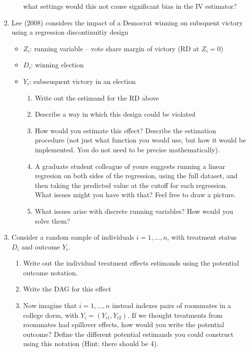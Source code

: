 \documentclass[11pt, a4paper]{article}
\begin{document}
\begin{enumerate}
\begin{enumerate}
      what settings would this not cause significant bias in the IV
      estimator?
    \end{enumerate}
  \item Lee (2008) considers the impact of a Democrat winning on subsquent victory using a regression discontinuitiy design
  \begin{itemize}
  \item $Z_{i}$: running variable -- vote share margin of victory (RD at $Z_{i} = 0$)
  \item $D_{i}$: winning election
  \item $Y_{i}$: subseuquent victory in an election
    \begin{enumerate}
    \item Write out the estimand for the RD above
    \item Describe a way in which this design could be violated
    \item How would you estimate this effect? Describe the estimation
      procedure (not just what function you would use, but how it
      would be implemented. You do not need to be precise
      mathematically).
    \item A graduate student colleague of yours suggests running a
      linear regresion on both sides of the regression, using the full
      dataset, and then taking the predicted value at the cutoff for
      each regression. What issues might you have with that? Feel free
      to draw a picture.
    \item What issues arise with discrete running variables? How would
      you solve them?
    \end{enumerate}
  \end{itemize}
  \item Consider a random sample of individuals $i= 1, \ldots, n$,
    with treatment status $D_{i}$ and outcome $Y_{i}$.
    \begin{enumerate}
    \item Write out the individual treatment effects estimands using the potential outcome notation.
    \item Write the DAG for this effect
    \item Now imagine that $i= 1, \ldots, n$ instead indexes pairs of
      roommates in a college dorm, with $Y_{i} = (Y_{i1}, Y_{i2})$. If
      we thought treatments from roommates had spillover effects, how
      would you write the potential outcome? Define the different
      potential estimands you could construct using this notation
      (Hint: there should be 4).

\end{enumerate}
\end{enumerate}
\end{document}
